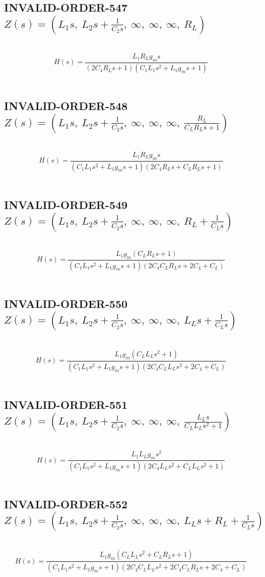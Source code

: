 \documentclass{article}
\begin{document}
\subsection{INVALID-ORDER-547 $Z(s) = \left( L_{1} s, \  L_{2} s + \frac{1}{C_{2} s}, \  \infty, \  \infty, \  \infty, \  R_{L}\right)$ } \ 
\textbf{\[H(s) = \frac{L_{1} R_{L} g_{m} s}{\left(2 C_{4} R_{L} s + 1\right) \left(C_{1} L_{1} s^{2} + L_{1} g_{m} s + 1\right)}\] } \ 
\subsection{INVALID-ORDER-548 $Z(s) = \left( L_{1} s, \  L_{2} s + \frac{1}{C_{2} s}, \  \infty, \  \infty, \  \infty, \  \frac{R_{L}}{C_{L} R_{L} s + 1}\right)$ } \ 
\textbf{\[H(s) = \frac{L_{1} R_{L} g_{m} s}{\left(C_{1} L_{1} s^{2} + L_{1} g_{m} s + 1\right) \left(2 C_{4} R_{L} s + C_{L} R_{L} s + 1\right)}\] } \ 
\subsection{INVALID-ORDER-549 $Z(s) = \left( L_{1} s, \  L_{2} s + \frac{1}{C_{2} s}, \  \infty, \  \infty, \  \infty, \  R_{L} + \frac{1}{C_{L} s}\right)$ } \ 
\textbf{\[H(s) = \frac{L_{1} g_{m} \left(C_{L} R_{L} s + 1\right)}{\left(C_{1} L_{1} s^{2} + L_{1} g_{m} s + 1\right) \left(2 C_{4} C_{L} R_{L} s + 2 C_{4} + C_{L}\right)}\] } \ 
\subsection{INVALID-ORDER-550 $Z(s) = \left( L_{1} s, \  L_{2} s + \frac{1}{C_{2} s}, \  \infty, \  \infty, \  \infty, \  L_{L} s + \frac{1}{C_{L} s}\right)$ } \ 
\textbf{\[H(s) = \frac{L_{1} g_{m} \left(C_{L} L_{L} s^{2} + 1\right)}{\left(C_{1} L_{1} s^{2} + L_{1} g_{m} s + 1\right) \left(2 C_{4} C_{L} L_{L} s^{2} + 2 C_{4} + C_{L}\right)}\] } \ 
\subsection{INVALID-ORDER-551 $Z(s) = \left( L_{1} s, \  L_{2} s + \frac{1}{C_{2} s}, \  \infty, \  \infty, \  \infty, \  \frac{L_{L} s}{C_{L} L_{L} s^{2} + 1}\right)$ } \ 
\textbf{\[H(s) = \frac{L_{1} L_{L} g_{m} s^{2}}{\left(C_{1} L_{1} s^{2} + L_{1} g_{m} s + 1\right) \left(2 C_{4} L_{L} s^{2} + C_{L} L_{L} s^{2} + 1\right)}\] } \ 
\subsection{INVALID-ORDER-552 $Z(s) = \left( L_{1} s, \  L_{2} s + \frac{1}{C_{2} s}, \  \infty, \  \infty, \  \infty, \  L_{L} s + R_{L} + \frac{1}{C_{L} s}\right)$ } \ 
\textbf{\[H(s) = \frac{L_{1} g_{m} \left(C_{L} L_{L} s^{2} + C_{L} R_{L} s + 1\right)}{\left(C_{1} L_{1} s^{2} + L_{1} g_{m} s + 1\right) \left(2 C_{4} C_{L} L_{L} s^{2} + 2 C_{4} C_{L} R_{L} s + 2 C_{4} + C_{L}\right)}\] } \ 
\end{document}
